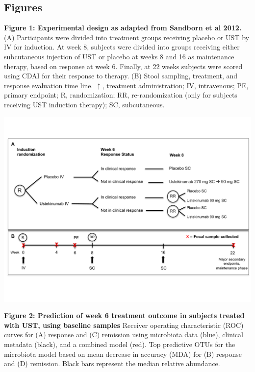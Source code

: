 \documentclass[12pt,]{article}
\begin{document}
\newpage

\subsection{Figures}\label{figures}

\textbf{Figure 1: Experimental design as adapted from Sandborn et al
2012.} (A) Participants were divided into treatment groups receiving
placebo or UST by IV for induction. At week 8, subjects were divided
into groups receiving either subcutaneous injection of UST or placebo at
weeks 8 and 16 as maintenance therapy, based on response at week 6.
Finally, at 22 weeks subjects were scored using CDAI for their response
to therapy. (B) Stool sampling, treatment, and response evaluation time
line. \(\uparrow\), treatment administration; IV, intravenous; PE,
primary endpoint; R, randomization; RR, re-randomization (only for
subjects receiving UST induction therapy); SC, subcutaneous.

\includegraphics{figures/Figure1_expdesign.pdf}

\newpage

\textbf{Figure 2: Prediction of week 6 treatment outcome in subjects
treated with UST, using baseline samples} Receiver operating
characteristic (ROC) curves for (A) response and (C) remission using
microbiota data (blue), clinical metadata (black), and a combined model
(red). Top predictive OTUs for the microbiota model based on mean
decrease in accuracy (MDA) for (B) response and (D) remission. Black
bars represent the median relative abundance.
\end{document}
